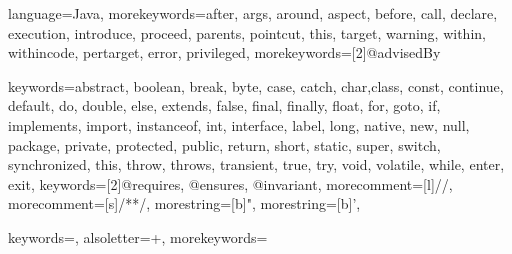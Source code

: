 \usepackage{soul}
\usepackage{xcolor}

 {
  language=Java,
  morekeywords={after, args, around, aspect, before, call, declare, execution, introduce, proceed, parents, pointcut, this, target, warning, within, withincode, pertarget, error, privileged},
  morekeywords=[2]{@advisedBy}
}

 {      
  keywords={abstract, boolean, break, byte,%
            case, catch, char,class, const, continue, default, do, double, else, extends,%
            false, final, finally, float, for, goto, if, implements, import, instanceof,%
            int, interface, label, long, native, new, null, package, private, protected,%
            public, return, short, static, super, switch, synchronized, this, throw, throws,%
            transient, true, try, void, volatile, while, enter, exit},
  keywords=[2]{@requires, @ensures, @invariant},
	morecomment=[l]//,    
  morecomment=[s]{/*}{*/},
  morestring=[b]",
  morestring=[b]',      
}

 {
  keywords={},
  alsoletter={+},
  morekeywords={}
}


%
